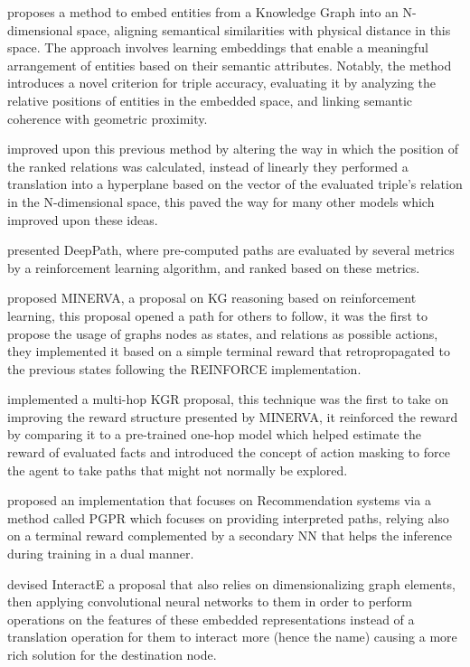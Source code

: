 \citet{bordes2013translating} proposes a method to embed entities from a Knowledge Graph into an N-dimensional space, aligning semantical similarities with physical distance in this space. The approach involves learning embeddings that enable a meaningful arrangement of entities based on their semantic attributes. Notably, the method introduces a novel criterion for triple accuracy, evaluating it by analyzing the relative positions of entities in the embedded space, and linking semantic coherence with geometric proximity.

\citet{wang2014knowledge} improved upon this previous method by altering the way in which the position of the ranked relations was calculated, instead of linearly they performed a translation into a hyperplane based on the vector of the evaluated triple's relation in the N-dimensional space, this paved the way for many other models which improved upon these ideas.

\citet{xiong2017deeppath} presented DeepPath, where pre-computed paths are evaluated by several metrics by a reinforcement learning algorithm, and ranked based on these metrics.

\citet{das2017go} proposed MINERVA, a proposal on KG reasoning based on reinforcement learning, this proposal opened a path for others to follow, it was the first to propose the usage of graphs nodes as states, and relations as possible actions, they implemented it based on a simple terminal reward that retropropagated to the previous states following the REINFORCE implementation.

\citet{lin2018multi} implemented a multi-hop KGR proposal, this technique was the first to take on improving the reward structure presented by MINERVA, it reinforced the reward by comparing it to a pre-trained one-hop model which helped estimate the reward of evaluated facts and introduced the concept of action masking to force the agent to take paths that might not normally be explored.

\citet{xian2019reinforcement} proposed an implementation that focuses on Recommendation systems via a method called PGPR which focuses on providing interpreted paths, relying also on a terminal reward complemented by a secondary NN that helps the inference during training in a dual manner.

\citet{vashishth2020interacte} devised InteractE a proposal that also relies on dimensionalizing graph elements, then applying convolutional neural networks to them in order to perform operations on the features of these embedded representations instead of a translation operation for them to interact more (hence the name) causing a more rich solution for the destination node.

